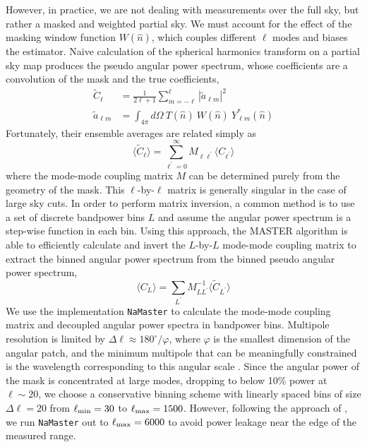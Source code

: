 \documentclass[a4paper,usenatbib]{mnras}
\begin{document}
However, in practice, we are not dealing with measurements over the full sky, but rather a masked and weighted partial sky. We must account for the effect of the masking window function $W(\hat{n})$, which couples different $\ell$ modes and biases the estimator. Naive calculation of the spherical harmonics transform on a partial sky map produces the pseudo angular power spectrum, whose coefficients are a convolution of the mask and the true coefficients,
\begin{align}
    \tilde{C}_{\ell} &= \frac{1}{2\ell + 1}\sum_{m=-\ell}^{\ell} |\tilde{a}_{\ell m}|^2 \\
    \tilde{a}_{\ell m} &= \int_{4\pi}d\Omega \ T(\hat{n}) \ W(\hat{n}) \ Y^{*}_{\ell m}(\hat{n}) %
\end{align}
Fortunately, their ensemble averages are related simply as
\begin{equation}
    \langle \tilde{C}_{\ell} \rangle = \sum_{\ell^{\prime}=0}^{\infty} M_{\ell \ell^{\prime}} \langle C_{\ell^{\prime}} \rangle
\end{equation}
where the mode-mode coupling matrix $M$ can be determined purely from the geometry of the mask.
This $\ell$-by-$\ell$ matrix is generally singular in the case of large sky cuts. In order to perform matrix inversion, a common method is to use a set of discrete bandpower bins $L$ and assume the angular power spectrum is a step-wise function in each bin. Using this approach, the MASTER algorithm \citep{MASTER} is able to efficiently calculate and invert the $L$-by-$L$ mode-mode coupling matrix to extract the binned angular power spectrum from the binned pseudo angular power spectrum,
%
\begin{equation}
    \langle C_{L} \rangle = \sum_{L^{\prime}} M_{L L^{\prime}}^{-1} \langle \tilde{C}_{L^{\prime}} \rangle
\end{equation}
We use the implementation \texttt{NaMaster} \citep{Alonso++19} to calculate the mode-mode coupling matrix and decoupled angular power spectra in bandpower bins. Multipole resolution is limited by $\Delta \ell \approx 180^{\circ} / \varphi$, where $\varphi$ is the smallest dimension of the angular patch, and the minimum multipole that can be meaningfully constrained is the wavelength corresponding to this angular scale \citep{Peebles80}. Since the angular power of the mask is concentrated at large modes, dropping to below 10\% power at $\ell \sim 20$, we choose a conservative binning scheme with linearly spaced bins of size $\Delta \ell = 20$ from $\ell_{\rm min} = 30$ to $\ell_{\rm max} = 1500$. However, following the approach of \cite{Krolewski19}, we run \texttt{NaMaster} out to $\ell_{\rm max} = 6000$ to avoid power leakage near the edge of the measured range.
\end{document}
